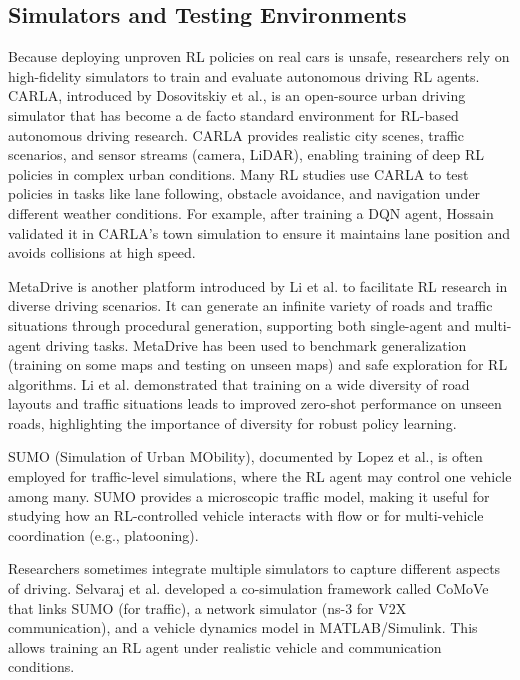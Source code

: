 \documentclass[12pt,a4paper]{article}
\begin{document}
\subsection{Simulators and Testing Environments}
Because deploying unproven RL policies on real cars is unsafe, researchers rely on high-fidelity simulators to train and evaluate autonomous driving RL agents. CARLA, introduced by Dosovitskiy et al.\cite{pmlr-v78-dosovitskiy17a}, is an open-source urban driving simulator that has become a de facto standard environment for RL-based autonomous driving research. CARLA provides realistic city scenes, traffic scenarios, and sensor streams (camera, LiDAR), enabling training of deep RL policies in complex urban conditions. Many RL studies use CARLA to test policies in tasks like lane following, obstacle avoidance, and navigation under different weather conditions. For example, after training a DQN agent, Hossain\cite{hossain2023} validated it in CARLA's town simulation to ensure it maintains lane position and avoids collisions at high speed.

MetaDrive is another platform introduced by Li et al.\cite{metadrive} to facilitate RL research in diverse driving scenarios. It can generate an infinite variety of roads and traffic situations through procedural generation, supporting both single-agent and multi-agent driving tasks. MetaDrive has been used to benchmark generalization (training on some maps and testing on unseen maps) and safe exploration for RL algorithms. Li et al. demonstrated that training on a wide diversity of road layouts and traffic situations leads to improved zero-shot performance on unseen roads, highlighting the importance of diversity for robust policy learning.

SUMO (Simulation of Urban MObility), documented by Lopez et al.\cite{lopez2018}, is often employed for traffic-level simulations, where the RL agent may control one vehicle among many. SUMO provides a microscopic traffic model, making it useful for studying how an RL-controlled vehicle interacts with flow or for multi-vehicle coordination (e.g., platooning).

Researchers sometimes integrate multiple simulators to capture different aspects of driving. Selvaraj et al.\cite{selvaraj2023} developed a co-simulation framework called CoMoVe that links SUMO (for traffic), a network simulator (ns-3 for V2X communication), and a vehicle dynamics model in MATLAB/Simulink. This allows training an RL agent under realistic vehicle and communication conditions.
\end{document}
